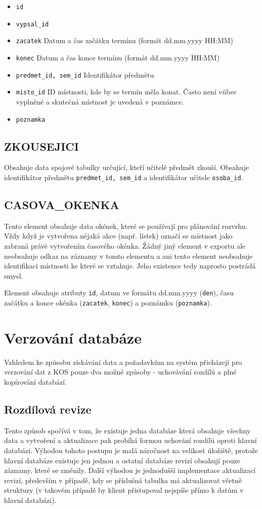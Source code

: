 \documentclass[11pt,twoside,a4paper]{book}
\begin{document}
\begin{itemize}
\item \texttt{id}
\item \texttt{vypsal\_id} 
\item \texttt{zacatek} Datum a čas začátku termínu (formát dd.mm.yyyy HH:MM)
\item \texttt{konec} Datum a čas konce termínu (formát dd.mm.yyyy HH:MM)
\item \texttt{predmet\_id, sem\_id} Identifikátor předmětu
\item \texttt{misto\_id} ID místnosti, kde by se termín měla konat. Často není vůbec vyplněné a skutečná místnost je uvedená v poznámce.
\item \texttt{poznamka}
\end{itemize}

\subsection{ZKOUSEJICI}
Obsahuje data spojové tabulky určující, kteří učitelé předmět zkouší. Obsahuje identifikátor předmětu \texttt{predmet\_id, sem\_id} a identifikátor učitele \texttt{osoba\_id}.

\subsection{CASOVA\_OKENKA}
Tento element obsahuje data okének, které se používají pro plánování rozvrhu. Vždy když je vytvořena nějaká akce (např. lístek) označí se místnost jako zabraná právě vytvořením časového okénka. Žádný jiný element v exportu ale neobsahuje odkaz na záznamy v tomto elementu a ani tento element neobsahuje identifikaci místnosti ke které se vztahuje. Jeho existence tedy naprosto postrádá smysl.

Element obsahuje atributy \texttt{id}, datum ve formátu dd.mm.yyyy (\texttt{den}), času začátku a konce okénka (\texttt{zacatek}, \texttt{konec}) a poznámku (\texttt{poznamka}).

\section{Verzování databáze}
Vzhledem ke způsobu získávání data a požadavkům na systém přicházejí pro verzování dat z KOS pouze dva možné způsoby - uchovávání rozdílů a plné kopírování databází.

\subsection{Rozdílová revize}
Tento způsob spočívá v tom, že existuje jedna databáze která obsahuje všechny data a vytvoření a aktualizace pak probíhá formou uchování rozdílů oproti hlavní databázi. Výhodou tohoto postupu je malá náročnost na velikost úložiště, protože hlavní databáze existuje jen jednou a ostatní databáze revizí obsahují pouze záznamy, které se změnily. Další výhodou je jednodušší implementace aktualizací revizí, především v případě, kdy se příslušná tabulka má aktualizovat včetně struktury (v takovém případě by klient přistupoval nejspíše přímo k datům v hlavní databázi).
\end{document}
